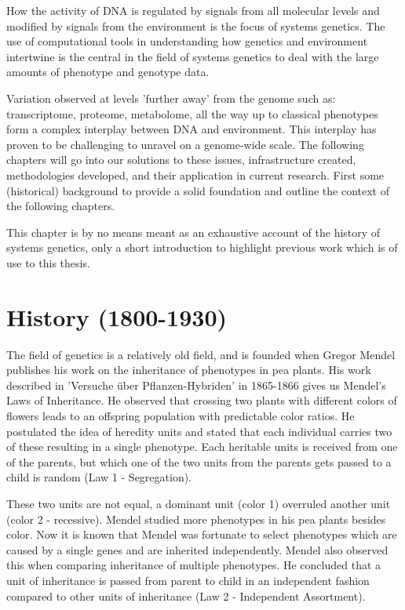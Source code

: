 How the activity of DNA is regulated by signals from all molecular levels and modified by 
signals from the environment is the focus of systems genetics. The use of computational 
tools in understanding how genetics and environment intertwine is the central in the 
field of systems genetics to deal with the large amounts of phenotype and genotype data.

Variation observed at levels 'further away' from the genome such as: transcriptome, 
proteome, metabolome, all the way up to classical phenotypes form a complex interplay 
between DNA and environment. This interplay has proven to be challenging to unravel 
on a genome-wide scale. The following chapters will go into our solutions to these issues, 
infrastructure created, methodologies developed, and their application in current 
research. First some (historical) background to provide a solid foundation  and outline
the context of the following chapters. 

This chapter is by no means meant as an exhaustive account of the history of systems genetics, 
only a short introduction to highlight previous work which is of use to this thesis.

\section{History (1800-1930)}

The field of genetics is a relatively old field, and is founded when Gregor 
Mendel publishes his work on the inheritance of phenotypes in pea plants. 
His work described in 'Versuche \"uber Pflanzen-Hybriden' in 1865-1866 
\cite{Mendel:1866} gives us Mendel's Laws of Inheritance. He observed that 
crossing two plants with different colors of flowers leads to an offspring 
population with predictable color ratios. He postulated the idea of heredity 
units and stated that each individual carries two of these resulting in a 
single phenotype. Each heritable units is received from one of the parents, 
but which one of the two units from the parents gets passed to a child is random 
(Law 1 - Segregation).

These two units are not equal, a dominant unit (color 1) overruled another 
unit (color 2 - recessive). Mendel studied more phenotypes in his pea plants 
besides color. Now it is known that Mendel was fortunate to select 
phenotypes which are caused by a single genes and are inherited independently. 
Mendel also observed this when comparing inheritance of multiple phenotypes. 
He concluded that a unit of inheritance is passed from parent to child in an 
independent fashion compared to other units of inheritance 
(Law 2 - Independent Assortment).

